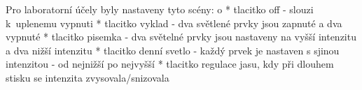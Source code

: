 \medskip

{\sbf Pro laboratorní účely byly nastaveny tyto scény:}
\begitems \style o
* tlacitko off - slouzi k~uplenemu vypnuti
* tlacitko vyklad - dva světlené prvky jsou zapnuté a dva vypnuté
* tlacitko pisemka - dva světelné prvky jsou nastaveny na vyšší intenzitu a dva nižší intenzitu
* tlacitko denní svetlo - každý prvek je nastaven s sjinou intenzitou - od nejnižší po nejvyšší
* tlacitko regulace jasu, kdy při dlouhem stisku se intenzita zvysovala/snizovala
\enditems









